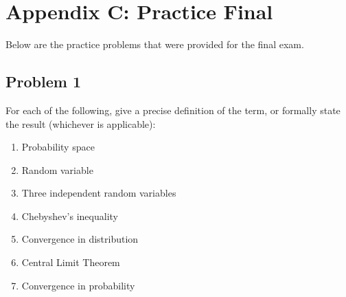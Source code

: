 \section{Appendix C: Practice Final}
Below are the practice problems that were provided for the final exam.

\subsection{Problem 1}
For each of the following, give a precise definition of the term, or formally state the result (whichever is applicable):
\begin{enumerate}
    \item Probability space
    \item Random variable
    \item Three independent random variables
    \item Chebyshev's inequality
    \item Convergence in distribution
    \item Central Limit Theorem
    \item Convergence in probability
\end{enumerate}
